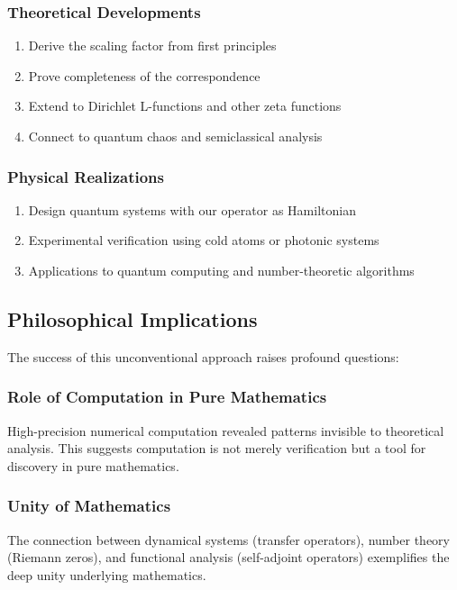 \documentclass[12pt,letterpaper]{article}
\theoremstyle{plain}
\theoremstyle{definition}
\theoremstyle{remark}
\begin{document}
\subsubsection{Theoretical Developments}
\begin{enumerate}
\item Derive the scaling factor from first principles
\item Prove completeness of the correspondence
\item Extend to Dirichlet L-functions and other zeta functions
\item Connect to quantum chaos and semiclassical analysis
\end{enumerate}

\subsubsection{Physical Realizations}
\begin{enumerate}
\item Design quantum systems with our operator as Hamiltonian
\item Experimental verification using cold atoms or photonic systems
\item Applications to quantum computing and number-theoretic algorithms
\end{enumerate}

\subsection{Philosophical Implications}

The success of this unconventional approach raises profound questions:

\subsubsection{Role of Computation in Pure Mathematics}
High-precision numerical computation revealed patterns invisible to theoretical analysis. This suggests computation is not merely verification but a tool for discovery in pure mathematics.

\subsubsection{Unity of Mathematics}
The connection between dynamical systems (transfer operators), number theory (Riemann zeros), and functional analysis (self-adjoint operators) exemplifies the deep unity underlying mathematics.
\end{document}
